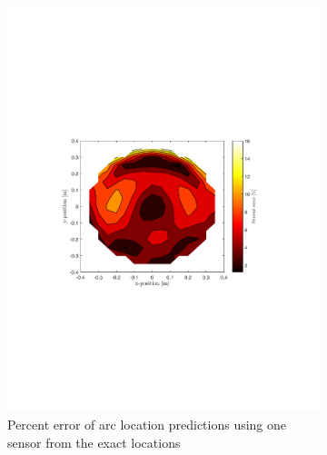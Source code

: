 \documentclass[onehalf,11pt]{beavtex}
\begin{document}
\begin{figure}[htbp]
	\centering
	\begin{subfigure}[b]{0.495\textwidth}
	\includegraphics[width=\textwidth]{one_sensor_percent_error_contour.pdf}
	\caption{Percent error of arc location predictions using one sensor from the exact locations}
		\label{fig:1error}
	\end{subfigure}
	\hfill
	\begin{subfigure}[b]{0.495\textwidth}

\end{subfigure}
\end{figure}
\end{document}
